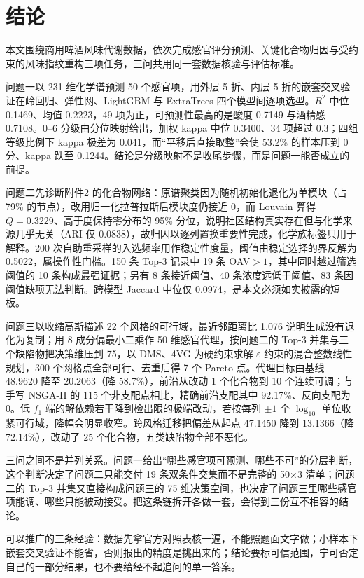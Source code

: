\section{结论}

本文围绕商用啤酒风味代谢数据，依次完成感官评分预测、关键化合物归因与受约束的风味指纹重构三项任务，三问共用同一套数据核验与评估标准。

问题一以 231 维化学谱预测 50 个感官项，用外层 5 折、内层 5 折的嵌套交叉验证在岭回归、弹性网、LightGBM 与 ExtraTrees 四个模型间逐项选型。$R^2$ 中位 0.1469、均值 0.2223，49 项为正，可预测性最高的是酸度 0.7149 与酒精感 0.7108。0--6 分级由分位映射给出，加权 kappa 中位 0.3400、34 项超过 0.3；四组等级比例下 kappa 极差为 0.041，而“平移后直接取整”会使 53.2\% 的样本压到 0 分、kappa 跌至 0.1244。结论是分级映射不是收尾步骤，而是问题一能否成立的前提。

问题二先诊断附件2 的化合物网络：原谱聚类因为随机初始化退化为单模块（占 79\% 的节点），改用归一化拉普拉斯后模块度仍接近 0，而 Louvain 算得 $Q=0.3229$、高于度保持零分布的 95\% 分位，说明社区结构真实存在但与化学来源几乎无关（ARI 仅 0.0838），故归因以逐列置换重要性完成，化学族标签只用于解释。200 次自助重采样的入选频率用作稳定性度量，阈值由稳定选择的界反解为 0.5022，属操作性门槛。150 条 Top-3 记录中 19 条 OAV$>1$，其中同时越过筛选阈值的 10 条构成最强证据；另有 8 条接近阈值、40 条浓度远低于阈值、83 条因阈值缺项无法判断。跨模型 Jaccard 中位仅 0.0974，是本文必须如实披露的短板。

问题三以收缩高斯描述 22 个风格的可行域，最近邻距离比 1.076 说明生成没有退化为复制；用 8 成分偏最小二乘作 50 维感官代理，按问题二的 Top-3 并集与三个缺陷物把决策维压到 75，以 DMS、4VG 为硬约束求解 $\varepsilon$-约束的混合整数线性规划，300 个网格点全部可行、去重后得 7 个 Pareto 点。代理目标由基线 48.9620 降至 20.2063（降 58.7\%），前沿从改动 1 个化合物到 10 个连续可调；与手写 NSGA-II 的 115 个非支配点相比，精确前沿支配其中 92.17\%、反向支配为 0。低 $f_1$ 端的解依赖若干降到检出限的极端改动，若按每列 $\pm1$ 个 $\log_{10}$ 单位收紧可行域，降幅会明显收窄。跨风格迁移把偏差从起点 47.1450 降到 13.1366（降 72.14\%），改动了 25 个化合物，五类缺陷物全部不恶化。

三问之间不是并列关系。问题一给出“哪些感官项可预测、哪些不可”的分层判断，这个判断决定了问题二只能交付 19 条双条件交集而不是完整的 50×3 清单；问题二的 Top-3 并集又直接构成问题三的 75 维决策空间，也决定了问题三里哪些感官项能调、哪些只能被动接受。把这条链拆开各做一套，会得到三份互不相容的结论。

可以推广的三条经验：数据先拿官方对照表核一遍，不能照题面文字做；小样本下嵌套交叉验证不能省，否则报出的精度是挑出来的；结论要标可信范围，宁可否定自己的一部分结果，也不要给经不起追问的单一答案。
